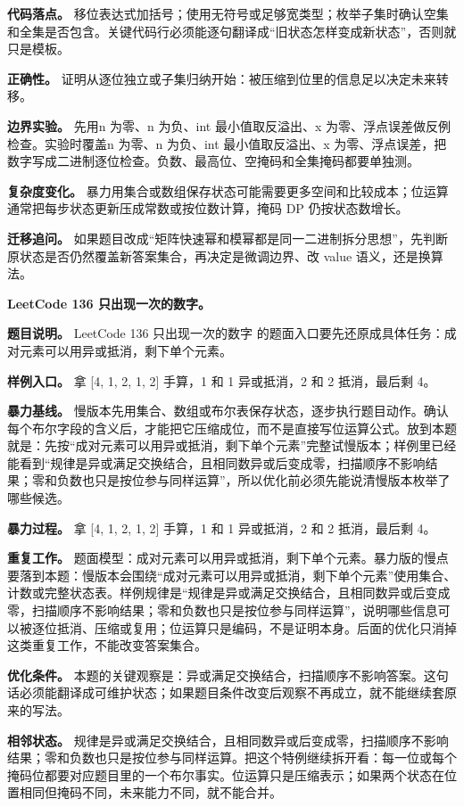 \textbf{代码落点。} 移位表达式加括号；使用无符号或足够宽类型；枚举子集时确认空集和全集是否包含。关键代码行必须能逐句翻译成“旧状态怎样变成新状态”，否则就只是模板。

\textbf{正确性。} 证明从逐位独立或子集归纳开始：被压缩到位里的信息足以决定未来转移。

\textbf{边界实验。} 先用n 为零、n 为负、int 最小值取反溢出、x 为零、浮点误差做反例检查。实验时覆盖n 为零、n 为负、int 最小值取反溢出、x 为零、浮点误差，把数字写成二进制逐位检查。负数、最高位、空掩码和全集掩码都要单独测。

\textbf{复杂度变化。} 暴力用集合或数组保存状态可能需要更多空间和比较成本；位运算通常把每步状态更新压成常数或按位数计算，掩码 DP 仍按状态数增长。

\textbf{迁移追问。} 如果题目改成“矩阵快速幂和模幂都是同一二进制拆分思想”，先判断原状态是否仍然覆盖新答案集合，再决定是微调边界、改 value 语义，还是换算法。

\noindent\textbf{LeetCode 136 只出现一次的数字。}

\textbf{题目说明。} LeetCode 136 只出现一次的数字 的题面入口要先还原成具体任务：成对元素可以用异或抵消，剩下单个元素。

\textbf{样例入口。} 拿 [4, 1, 2, 1, 2] 手算，1 和 1 异或抵消，2 和 2 抵消，最后剩 4。

\textbf{暴力基线。} 慢版本先用集合、数组或布尔表保存状态，逐步执行题目动作。确认每个布尔字段的含义后，才能把它压缩成位，而不是直接写位运算公式。放到本题就是：先按“成对元素可以用异或抵消，剩下单个元素”完整试慢版本；样例里已经能看到“规律是异或满足交换结合，且相同数异或后变成零，扫描顺序不影响结果；零和负数也只是按位参与同样运算”，所以优化前必须先能说清慢版本枚举了哪些候选。

\textbf{暴力过程。} 拿 [4, 1, 2, 1, 2] 手算，1 和 1 异或抵消，2 和 2 抵消，最后剩 4。

\textbf{重复工作。} 题面模型：成对元素可以用异或抵消，剩下单个元素。暴力版的慢点要落到本题：慢版本会围绕“成对元素可以用异或抵消，剩下单个元素”使用集合、计数或完整状态表。样例规律是“规律是异或满足交换结合，且相同数异或后变成零，扫描顺序不影响结果；零和负数也只是按位参与同样运算”，说明哪些信息可以被逐位抵消、压缩或复用；位运算只是编码，不是证明本身。后面的优化只消掉这类重复工作，不能改变答案集合。

\textbf{优化条件。} 本题的关键观察是：异或满足交换结合，扫描顺序不影响答案。这句话必须能翻译成可维护状态；如果题目条件改变后观察不再成立，就不能继续套原来的写法。

\textbf{相邻状态。} 规律是异或满足交换结合，且相同数异或后变成零，扫描顺序不影响结果；零和负数也只是按位参与同样运算。把这个特例继续拆开看：每一位或每个掩码位都要对应题目里的一个布尔事实。位运算只是压缩表示；如果两个状态在位置相同但掩码不同，未来能力不同，就不能合并。

